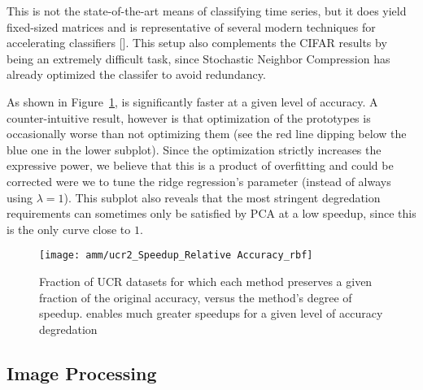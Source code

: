 This is not the state-of-the-art means of classifying time series, but it does yield fixed-sized matrices and is representative of several modern techniques for accelerating classifiers []. This setup also complements the CIFAR results by being an extremely difficult task, since Stochastic Neighbor Compression has already optimized the classifer to avoid redundancy. %

As shown in Figure~\ref{fig:ucr}, \oursp is significantly faster at a given level of accuracy. A counter-intuitive result, however is that optimization of the prototypes is occasionally worse than not optimizing them (see the red line dipping below the blue one in the lower subplot). Since the optimization strictly increases the expressive power, we believe that this is a product of overfitting and could be corrected were we to tune the ridge regression's parameter (instead of always using $\lambda = 1$). This subplot also reveals that the most stringent degredation requirements can sometimes only be satisfied by PCA at a low speedup, since this is the only curve close to $1$.

\begin{figure}[h]
\begin{center}
\texttt{[image: amm/ucr2\_Speedup\_Relative Accuracy\_rbf]}
\caption{Fraction of UCR datasets for which each method preserves a given fraction of the original accuracy, versus the method's degree of speedup. \oursp enables much greater speedups for a given level of accuracy degredation}
\label{fig:ucr}
\end{center}
\end{figure}

\subsection{Image Processing}

